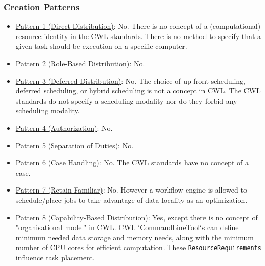 \subsubsection{Creation Patterns}
\begin{itemize}
\item \href{http://www.workflowpatterns.com/patterns/resource/creation/wrp1.php}{Pattern 1 (Direct Distribution)}:  No. There is no concept of a (computational) resource identity in the CWL standards. There is no method to specify that a given task should be execution on a specific computer.

\item \href{http://www.workflowpatterns.com/patterns/resource/creation/wrp2.php}{Pattern 2 (Role-Based Distribution)}: No.

\item \href{http://www.workflowpatterns.com/patterns/resource/creation/wrp3.php}{Pattern 3 (Deferred Distribution)}:  No. The choice of up front scheduling, deferred scheduling, or hybrid scheduling is not a concept in CWL. The CWL standards do not specify a scheduling modality nor do they forbid any scheduling modality.

\item \href{http://www.workflowpatterns.com/patterns/resource/creation/wrp4.php}{Pattern 4 (Authorization)}: No.

\item \href{http://www.workflowpatterns.com/patterns/resource/creation/wrp5.php}{Pattern 5 (Separation of Duties)}: No.

\item \href{http://www.workflowpatterns.com/patterns/resource/creation/wrp6.php}{Pattern 6 (Case Handling)}: No. The CWL standards have no concept of a case.

\item \href{http://www.workflowpatterns.com/patterns/resource/creation/wrp7.php}{Pattern 7 (Retain Familiar)}: No. However a workflow engine is allowed to schedule/place jobs to take advantage of data locality as an optimization.

\item \href{http://www.workflowpatterns.com/patterns/resource/creation/wrp8.php}{Pattern 8 (Capability-Based Distribution)}: Yes, except there is no concept of "organisational model" in CWL. CWL `CommandLineTool`s can define minimum needed data storage and memory needs, along with the minimum number of CPU cores for efficient computation. These \verb|ResourceRequirements| influence task placement.


\end{itemize}
